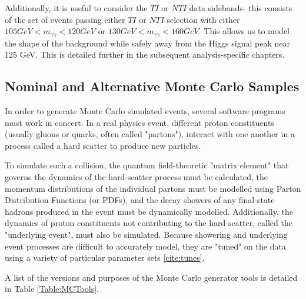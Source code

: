 Additionally, it is useful to consider the $TI$ or $NTI$ data sidebands- this consists of the set of events passing either $TI$ or $NTI$ selection with either $105 GeV < m_{\gamma\gamma} < 120 GeV$ or $130 GeV < m_{\gamma\gamma} < 160 GeV$. This allows us to model the shape of the background while safely away from the Higgs signal peak near 125 GeV. This is detailed further in the subsequent analysis-specific chapters.

\subsection{Nominal and Alternative Monte Carlo Samples} \label{sec:NominalMC} 

In order to generate Monte Carlo simulated events, several software programs must work in concert. In a real physics event, different proton constituents (usually gluons or quarks, often called "partons"), interact with one another in a process called a hard scatter to produce new particles. 

To simulate such a collision, the quantum field-theoretic "matrix element" that governs the dynamics of the hard-scatter process must be calculated, the momentum distributions of the individual partons must be modelled using Parton Distribution Functions (or PDFs), and the decay showers of any final-state hadrons produced in the event must be dynamically modelled. Additionally, the dynamics of proton constituents not contributing to the hard scatter, called the "underlying event", must also be simulated. Because showering and underlying event processes are difficult to accurately model, they are "tuned" on the data using a variety of particular parameter sets \ref{cite:tunes}. 

A list of the versions and purposes of the Monte Carlo generator tools is detailed in Table \ref{Table:MCTools}. 

